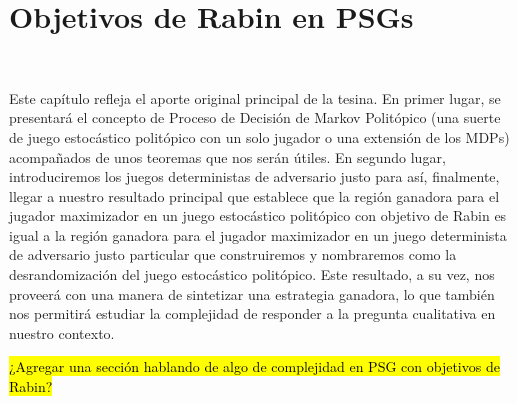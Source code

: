 \chapter{Objetivos de Rabin en PSGs}
~\label{cap:results}

Este capítulo refleja el aporte original principal de la tesina. En primer
lugar, se presentará el concepto de Proceso de Decisión de Markov Politópico
(una suerte de juego estocástico politópico con un solo jugador o una extensión
de los MDPs) acompañados de unos teoremas que nos serán útiles. En segundo
lugar, introduciremos los juegos deterministas de adversario justo para así,
finalmente, llegar a nuestro resultado principal que establece que la región
ganadora para el jugador maximizador en un juego estocástico politópico con
objetivo de Rabin es igual a la región ganadora para el jugador maximizador en
un juego determinista de adversario justo particular que construiremos y
nombraremos como la desrandomización del juego estocástico politópico. Este
resultado, a su vez, nos proveerá con una manera de sintetizar una estrategia
ganadora, lo que también nos permitirá estudiar la complejidad de responder a
la pregunta cualitativa en nuestro contexto.





\hl{¿Agregar una sección hablando de algo de complejidad en PSG con objetivos de Rabin?}
